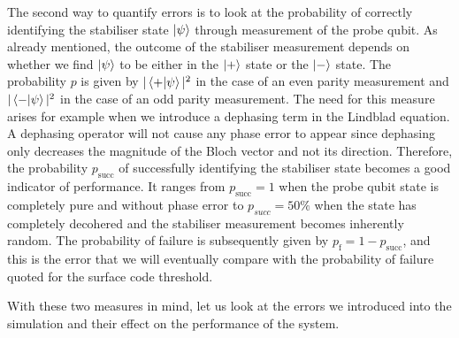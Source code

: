 The second way to quantify errors is to look at the probability of correctly identifying the stabiliser state  $\ket{\psi}$ through measurement of the probe qubit. As already mentioned, the outcome of the stabiliser measurement depends on whether we find $\ket{\psi}$ to be either in the $\ket{+}$ state or the $\ket{-}$ state. The probability $p$ is given by $|\left\langle +|\psi \right\rangle|^2$ in the case of an even parity measurement and $|\left\langle - |\psi \right\rangle|^2$ in the case of an odd parity measurement. The need for this measure arises for example when we introduce a dephasing term in the Lindblad equation. A dephasing operator will not cause any phase error to appear since dephasing only decreases the magnitude of the Bloch vector and not its direction. Therefore, the probability $p_{\mathrm{succ}}$ of successfully identifying the stabiliser state becomes a good indicator of performance. It ranges from $p_{\mathrm{succ}} = 1$ when the probe qubit state is completely pure and without phase error to $p_{succ} = 50 \%$ when the state has completely decohered and the stabiliser measurement becomes inherently random. The probability of failure is subsequently given by $p_{\mathrm{f}} =1- p_{\mathrm{succ}} $, and this is the error that we will eventually compare with the probability of failure quoted for the surface code threshold. 

With these two measures in mind, let us look at the errors we introduced into the simulation and their effect on the performance of the system. 




